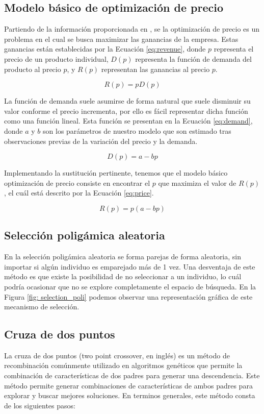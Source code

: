 \subsection{Modelo básico de optimización de precio}
Partiendo de la información proporcionada en \cite{Talluri2019}, se la optimización de precio es un problema en el cual se busca maximizar las ganancias de la empresa. Estas ganancias están establecidas por la Ecuación \ref{eq:revenue}, donde $p$ representa el precio de un producto individual, $D(p)$ representa la función de demanda del producto al precio $p$, y $R(p)$ representan las ganancias al precio $p$.

\begin{equation}\label{eq:revenue}
	R(p)=pD(p)
\end{equation}

La función de demanda suele asumirse de forma natural que suele disminuir su valor conforme el precio incrementa, por ello es fácil representar dicha función como una función lineal. Esta función se presentan en la Ecuación \ref{eq:demand}, donde $a$ y $b$ son los parámetros de nuestro modelo que son estimado tras observaciones previas de la variación del precio y la demanda.

\begin{equation}\label{eq:demand}
	D(p)=a-bp
\end{equation}

Implementando la sustitución pertinente, tenemos que el modelo básico optimización de precio consiste en encontrar el $p$ que maximiza el valor de $R(p)$, el cuál está descrito por la Ecuación \ref{eq:price}.

\begin{equation}\label{eq:price}
	R(p)=p(a-bp)
\end{equation}


\subsection{Selección poligámica aleatoria}
En la selección poligámica aleatoria se forma parejas de forma aleatoria, sin importar si algún individuo es emparejado más de 1 vez. Una desventaja de este método es que existe la posibilidad de no seleccionar a un individuo, lo cuál podría ocasionar que no se explore completamente el espacio de búsqueda. En la Figura \ref{fig: selection_poli} podemos observar una representación gráfica de este mecanismo de selección.


\subsection{Cruza de dos puntos}
La cruza de dos puntos (two point crossover, en inglés) es un método de recombinación comúnmente utilizado en algoritmos genéticos que permite la combinación de características de dos padres para generar una descendencia. Este método permite generar combinaciones de características de ambos padres para explorar y buscar mejores soluciones. En terminos generales, este método consta de los siguientes pasos:

